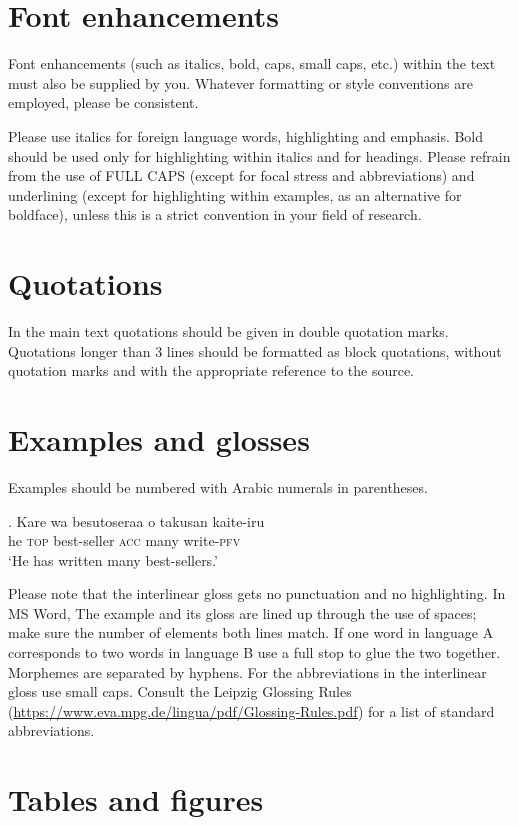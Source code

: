 \documentclass[times,linguex]{lsb}
\begin{document}
\section{Font enhancements}

Font enhancements (such as italics, bold, caps, small caps, etc.) within the text must also be supplied by you. Whatever formatting or style conventions are employed, please be consistent.

Please use italics for foreign language words, highlighting and emphasis. Bold should be used only for highlighting within italics and for headings. Please refrain from the use of FULL CAPS (except for focal stress and abbreviations) and underlining (except for highlighting within examples, as an alternative for boldface), unless this is a strict convention in your field of research.


\section{Quotations}

In the main text quotations should be given in double quotation marks. Quotations longer than 3 lines should be formatted as block quotations, without quotation marks and with the appropriate reference to the source.


\section{Examples and glosses}

Examples should be numbered with Arabic numerals in parentheses.

\exg. Kare wa besutoseraa o takusan kaite-iru\\
he \textsc{top} best-seller \textsc{acc} many write-\textsc{pfv}\\
\glt ‘He has written many best-sellers.’ 

Please note that the interlinear gloss gets no punctuation and no highlighting. In MS Word,  The example and its gloss are lined up through the use of spaces; make sure the number of elements both lines match. If one word in language A corresponds to two words in language B use a full stop to glue the two together. Morphemes are separated by hyphens. For the abbreviations in the interlinear gloss use small caps. Consult the Leipzig Glossing Rules (\url{https://www.eva.mpg.de/lingua/pdf/Glossing-Rules.pdf}) for a list of standard abbreviations.

\section{Tables and figures}
\end{document}
